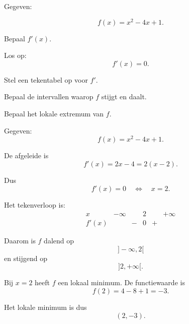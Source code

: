 \documentclass{ximera}
\begin{document}

\begin{oefening}{\oefB\ESS}

Gegeven:

\[
f(x)=x^2-4x+1.
\]

\begin{question}
Bepaal $f'(x)$.
\end{question}

\begin{question}
Los op:
\[
f'(x)=0.
\]
\end{question}

\begin{question}
Stel een tekentabel op voor $f'$.
\end{question}

\begin{question}
Bepaal de intervallen waarop $f$ stijgt en daalt.
\end{question}

\begin{question}
Bepaal het lokale extremum van $f$.
\end{question}

\begin{oplossing}

Gegeven:
\[
f(x)=x^2-4x+1.
\]

De afgeleide is
\[
f'(x)=2x-4=2(x-2).
\]

Dus
\[
f'(x)=0
\quad\Longleftrightarrow\quad
x=2.
\]

Het tekenverloop is:
\[
\begin{array}{c|ccccc}
x & -\infty & & 2 & & +\infty\\ \hline
f'(x) & & - & 0 & + &
\end{array}
\]

Daarom is $f$ dalend op
\[
]-\infty,2[
\]
en stijgend op
\[
]2,+\infty[.
\]

Bij $x=2$ heeft $f$ een lokaal minimum. De functiewaarde is
\[
f(2)=4-8+1=-3.
\]

Het lokale minimum is dus
\[
\boxed{(2,-3)}.
\]

\end{oplossing}

\end{oefening}


\end{document}
